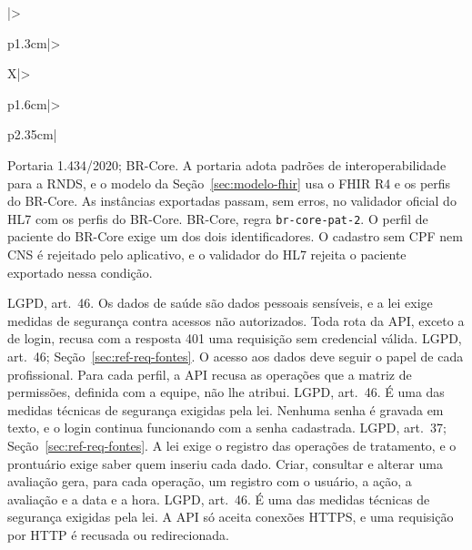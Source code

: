 \begin{apendicesenv}
{\begin{xltabular}{\textwidth}{|>{\raggedright\arraybackslash}p{1.3cm}|>{\raggedright\arraybackslash}X|>{\raggedright\arraybackslash}p{1.6cm}|>{\raggedright\arraybackslash}p{2.35cm}|}
		{Portaria 1.434/2020; BR-Core.}
		{A portaria adota padrões de interoperabilidade para a RNDS, e o modelo da Seção~\ref{sec:modelo-fhir} usa o
		FHIR R4 e os perfis do BR-Core.}
		{As instâncias exportadas passam, sem erros, no validador oficial do HL7 com os perfis do BR-Core.}
		{BR-Core, regra \texttt{br-core-pat-2}.}
		{O perfil de paciente do BR-Core exige um dos dois identificadores.}
		{O cadastro sem CPF nem CNS é rejeitado pelo aplicativo, e o validador do HL7 rejeita o paciente exportado
		nessa condição.}

		{LGPD, art.~46.}
		{Os dados de saúde são dados pessoais sensíveis, e a lei exige medidas de segurança contra acessos não
		autorizados.}
		{Toda rota da API, exceto a de login, recusa com a resposta 401 uma requisição sem credencial válida.}
		{LGPD, art.~46; Seção~\ref{sec:ref-req-fontes}.}
		{O acesso aos dados deve seguir o papel de cada profissional.}
		{Para cada perfil, a API recusa as operações que a matriz de permissões, definida com a equipe, não lhe
		atribui.}
		{LGPD, art.~46.}
		{É uma das medidas técnicas de segurança exigidas pela lei.}
		{Nenhuma senha é gravada em texto, e o login continua funcionando com a senha cadastrada.}
		{LGPD, art.~37; Seção~\ref{sec:ref-req-fontes}.}
		{A lei exige o registro das operações de tratamento, e o prontuário exige saber quem inseriu cada dado.}
		{Criar, consultar e alterar uma avaliação gera, para cada operação, um registro com o usuário, a ação, a
		avaliação e a data e a hora.}
		{LGPD, art.~46.}
		{É uma das medidas técnicas de segurança exigidas pela lei.}
		{A API só aceita conexões HTTPS, e uma requisição por HTTP é recusada ou redirecionada.}


\end{xltabular}}
\end{apendicesenv}
